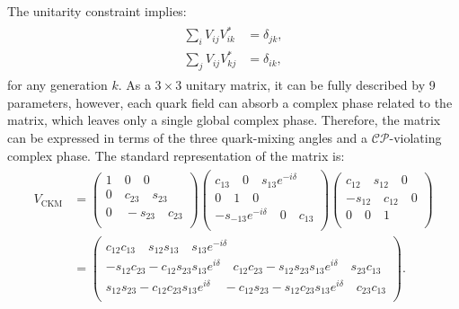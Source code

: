 The unitarity constraint implies:
\begin{align}\label{eq:unitarity}
    \begin{split}
    \sum_i V^{}_{ij} V_{ik}^* &= \delta_{jk},\\
    \sum_j V^{}_{ij} V_{kj}^* &= \delta_{ik},
    \end{split}
\end{align}
for any generation $k$.
As a $3\times3$ unitary matrix, it can be fully described by 9 parameters, however, each quark field can absorb a complex phase related to the matrix,
which leaves only a single global complex phase.
Therefore, the \CKM matrix can be expressed in terms of the three quark-mixing angles and a $\mathcal{CP}$-violating complex phase.
The standard representation of the \CKM matrix is:
\begin{align}
    \begin{split}
    V_{\mathrm{CKM}}&=
    \begin{pmatrix}
        1 \quad 0 \quad 0\\
        0 \quad c_{23} \quad s_{23}\\
        0 \quad -s_{23} \quad c_{23}\\
    \end{pmatrix}
    \begin{pmatrix}
        c_{13} \quad 0 \quad s_{13}e^{-i\delta}\\
        0      \quad 1 \quad 0\\
        -s_{-13}e^{-i\delta} \quad 0 \quad c_{13}\\
    \end{pmatrix}
    \begin{pmatrix}
        c_{12} \quad s_{12} \quad 0\\
        -s_{12} \quad c_{12} \quad 0\\
        0 \quad 0 \quad 1\\
    \end{pmatrix}
    \\
    &=
    \begin{pmatrix}
        c_{12}c_{13} \quad s_{12}s_{13} \quad s_{13}e^{-i\delta}\\
        -s_{12}c_{23} - c_{12}s_{23}s_{13}e^{i\delta} \quad c_{12}c_{23} - s_{12}s_{23}s_{13}e^{i\delta} \quad s_{23} c_{13}\\
        s_{12}s_{23} - c_{12}c_{23} s_{13}e^{i\delta} \quad -c_{12}s_{23} - s_{12}c_{23}s_{13}e^{i\delta} \quad c_{23}c_{13}\\
    \end{pmatrix}.
    \end{split}
\end{align}
